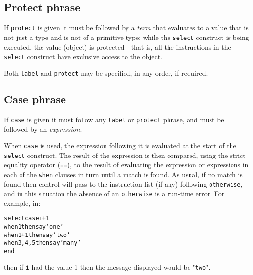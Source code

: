 \subsection{Protect phrase}
 
If \texttt{protect} is given it must be followed by a \emph{term}
that evaluates to a value that is not just a type and is not of a
primitive type;
while the \texttt{select} construct is being executed, the value
(object) is protected - that is, all the instructions in the
\texttt{select} construct have exclusive access to the object.
 
Both \texttt{label} and \texttt{protect} may be specified, in any order,
if required.
\subsection{Case phrase}
 
If \texttt{case} is given it must follow any \texttt{label} or
\texttt{protect} phrase, and must be followed by an
\emph{expression}.
 
When \texttt{case} is used, the expression following it is evaluated at
the start of the \texttt{select} construct.
The result of the expression is then compared, using the strict equality
operator (\texttt{==}), to the result of evaluating the expression
or expressions in each of the \texttt{when} clauses in turn until
a match is found.  As usual, if no match is found then control
will pass to the instruction list (if any) following
\texttt{otherwise}, and in this situation the absence of an
\texttt{otherwise} is a run-time error.
 For example, in:
\begin{alltt}
select case i+1
  when 1 then say 'one'
  when 1+1 then say 'two'
  when 3, 4, 5 then say 'many'
end
\end{alltt}
then if \texttt{i} had the value 1 then the message displayed would be
"\texttt{two}".
 
